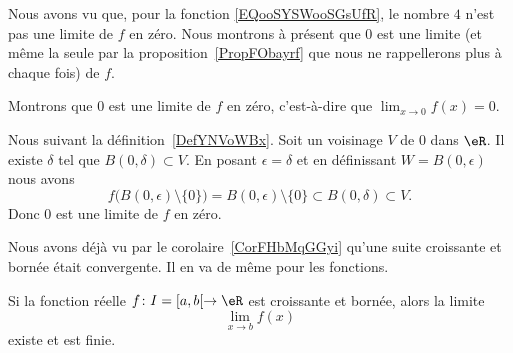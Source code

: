 \begin{example}
	Nous avons vu que, pour la fonction \eqref{EQooSYSWooSGsUfR}, le nombre \( 4\) n'est pas une limite de \( f\) en zéro. Nous montrons à présent que \( 0\) est une limite (et même la seule par la proposition~\ref{PropFObayrf} que nous ne rappellerons plus à chaque fois) de \( f\).

	Montrons que \( 0\) est une limite de \( f\) en zéro, c'est-à-dire que \( \lim_{x\to 0} f(x)=0\).

	Nous suivant la définition~\ref{DefYNVoWBx}. Soit un voisinage \( V\) de \( 0\) dans \( \eR\). Il existe \( \delta\) tel que \( B(0,\delta)\subset V\). En posant \( \epsilon=\delta\) et en définissant \( W=B(0,\epsilon)\) nous avons
	\begin{equation}
		f\big( B(0,\epsilon)\setminus\{ 0 \} \big)=B(0,\epsilon)\setminus\{ 0 \}\subset  B(0,\delta)\subset V.
	\end{equation}
	Donc \( 0\) est une limite de \( f\) en zéro.
\end{example}

Nous avons déjà vu par le corolaire~\ref{CorFHbMqGGyi} qu'une suite croissante et bornée était convergente. Il en va de même pour les fonctions.
\begin{proposition} \label{PropMTmBYeU}
	Si la fonction réelle \( f\colon I=\mathopen[ a , b [\to \eR\) est croissante et bornée, alors la limite
	\begin{equation}
		\lim_{x\to b} f(x)
	\end{equation}
	existe et est finie.
\end{proposition}


